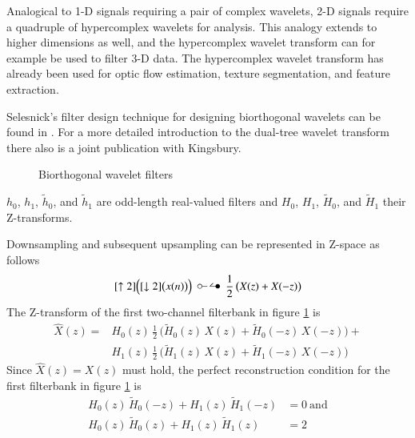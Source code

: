 \documentclass[a4paper,12pt]{book}
\begin{document}
Analogical to 1-D signals requiring a pair of complex wavelets, 2-D signals
require a quadruple of hypercomplex wavelets for analysis\cite{RefWorks:270}.
This analogy extends to higher
dimensions as well\cite{RefWorks:270}, and the hypercomplex wavelet transform
can for example be used to filter 3-D data\cite{RefWorks:419}.
The hypercomplex wavelet transform has already been used for optic
flow es\-ti\-ma\-ti\-on\-\cite{RefWorks:266}, texture
seg\-men\-ta\-ti\-on\-\cite{RefWorks:270}, and feature
ex\-trac\-ti\-on\-\cite{RefWorks:266}\cite{RefWorks:418}.

Selesnick's filter design technique for designing biorthogonal
wavelets can be found in \cite{RefWorks:396}. For a more
detailed introduction to the dual-tree wavelet transform there also is a
joint publication with Kingsbury\cite{RefWorks:398}.

\begin{figure}[tbhp]
  \begin{center}
    \caption{Biorthogonal wavelet filters\label{fig:fbank}} %
  \end{center}
\end{figure}

$h_0$, $h_1$, $\widetilde{h}_0$, and $\widetilde{h}_1$ are odd-length
real-valued filters and $H_0$, $H_1$, $\widetilde{H}_0$, and
$\widetilde{H}_1$ their Z-transforms.

Downsampling and subsequent upsampling can be represented in Z-space as
follows
\begin{equation}\label{equ:zsampling}
  [\uparrow 2]\Big([\downarrow 2]\big(x(n)\big)\Big)\ \ztransf\ \frac{1}{2}\,\big(X(z)+X(-z)\big)
\end{equation}
The Z-transform of the first two-channel filterbank in figure
\ref{fig:fbank} is
\begin{equation}\label{equ:aliasing1}
  \begin{split}
    \widehat{X}(z)=
    &H_0(z)\,\frac{1}{2}\,\big(\widetilde{H}_0(z)\,X(z)+\widetilde{H}_0(-z)\,X(-z)\big)+\\
    &H_1(z)\,\frac{1}{2}\,\big(\widetilde{H}_1(z)\,X(z)+\widetilde{H}_1(-z)\,X(-z)\big)
  \end{split}
\end{equation}
Since $\widehat{X}(z)=X(z)$ must hold, the perfect reconstruction condition for
the first filterbank in figure \ref{fig:fbank} is
\begin{equation}\label{equ:aliasing2}
  \begin{split}
    H_0(z)\,\widetilde{H}_0(-z)+H_1(z)\,\widetilde{H}_1(-z)&=0\mathrm{\ and}\\
    H_0(z)\,\widetilde{H}_0(z)+H_1(z)\,\widetilde{H}_1(z)&=2
  \end{split}
\end{equation} %
\end{document}
